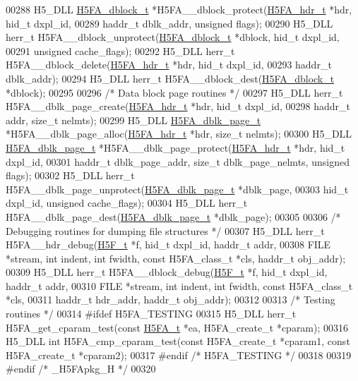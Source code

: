 \begin{DoxyCode}
00288 H5\_DLL \hyperlink{struct_h5_f_a__dblock__t}{H5FA\_dblock\_t} *H5FA\_\_dblock\_protect(\hyperlink{struct_h5_f_a__hdr__t}{H5FA\_hdr\_t} *hdr, hid\_t dxpl\_id,
00289     haddr\_t dblk\_addr, \textcolor{keywordtype}{unsigned} flags);
00290 H5\_DLL herr\_t H5FA\_\_dblock\_unprotect(\hyperlink{struct_h5_f_a__dblock__t}{H5FA\_dblock\_t} *dblock, hid\_t dxpl\_id,
00291     \textcolor{keywordtype}{unsigned} cache\_flags);
00292 H5\_DLL herr\_t H5FA\_\_dblock\_delete(\hyperlink{struct_h5_f_a__hdr__t}{H5FA\_hdr\_t} *hdr, hid\_t dxpl\_id,
00293     haddr\_t dblk\_addr);
00294 H5\_DLL herr\_t H5FA\_\_dblock\_dest(\hyperlink{struct_h5_f_a__dblock__t}{H5FA\_dblock\_t} *dblock);
00295 
00296 \textcolor{comment}{/* Data block page routines */}
00297 H5\_DLL herr\_t H5FA\_\_dblk\_page\_create(\hyperlink{struct_h5_f_a__hdr__t}{H5FA\_hdr\_t} *hdr, hid\_t dxpl\_id,
00298     haddr\_t addr, \textcolor{keywordtype}{size\_t} nelmts);
00299 H5\_DLL \hyperlink{struct_h5_f_a__dbk__page__t}{H5FA\_dblk\_page\_t} *H5FA\_\_dblk\_page\_alloc(\hyperlink{struct_h5_f_a__hdr__t}{H5FA\_hdr\_t} *hdr, \textcolor{keywordtype}{size\_t} nelmts);
00300 H5\_DLL \hyperlink{struct_h5_f_a__dbk__page__t}{H5FA\_dblk\_page\_t} *H5FA\_\_dblk\_page\_protect(\hyperlink{struct_h5_f_a__hdr__t}{H5FA\_hdr\_t} *hdr, hid\_t dxpl\_id,
00301     haddr\_t dblk\_page\_addr, \textcolor{keywordtype}{size\_t} dblk\_page\_nelmts, \textcolor{keywordtype}{unsigned} flags);
00302 H5\_DLL herr\_t H5FA\_\_dblk\_page\_unprotect(\hyperlink{struct_h5_f_a__dbk__page__t}{H5FA\_dblk\_page\_t} *dblk\_page,
00303     hid\_t dxpl\_id, \textcolor{keywordtype}{unsigned} cache\_flags);
00304 H5\_DLL herr\_t H5FA\_\_dblk\_page\_dest(\hyperlink{struct_h5_f_a__dbk__page__t}{H5FA\_dblk\_page\_t} *dblk\_page);
00305 
00306 \textcolor{comment}{/* Debugging routines for dumping file structures */}
00307 H5\_DLL herr\_t H5FA\_\_hdr\_debug(\hyperlink{struct_h5_f__t}{H5F\_t} *f, hid\_t dxpl\_id, haddr\_t addr,
00308     FILE *stream, \textcolor{keywordtype}{int} indent, \textcolor{keywordtype}{int} fwidth, \textcolor{keyword}{const} H5FA\_class\_t *cls, haddr\_t obj\_addr);
00309 H5\_DLL herr\_t H5FA\_\_dblock\_debug(\hyperlink{struct_h5_f__t}{H5F\_t} *f, hid\_t dxpl\_id, haddr\_t addr,
00310     FILE *stream, \textcolor{keywordtype}{int} indent, \textcolor{keywordtype}{int} fwidth, \textcolor{keyword}{const} H5FA\_class\_t *cls,
00311     haddr\_t hdr\_addr, haddr\_t obj\_addr);
00312 
00313 \textcolor{comment}{/* Testing routines */}
00314 \textcolor{preprocessor}{#ifdef H5FA\_TESTING}
00315 H5\_DLL herr\_t H5FA\_get\_cparam\_test(\textcolor{keyword}{const} \hyperlink{struct_h5_f_a__t}{H5FA\_t} *ea, H5FA\_create\_t *cparam);
00316 H5\_DLL \textcolor{keywordtype}{int} H5FA\_cmp\_cparam\_test(\textcolor{keyword}{const} H5FA\_create\_t *cparam1, \textcolor{keyword}{const} H5FA\_create\_t *cparam2);
00317 \textcolor{preprocessor}{#endif }\textcolor{comment}{/* H5FA\_TESTING */}\textcolor{preprocessor}{}
00318 
00319 \textcolor{preprocessor}{#endif }\textcolor{comment}{/* \_H5FApkg\_H */}\textcolor{preprocessor}{}
00320 
\end{DoxyCode}
